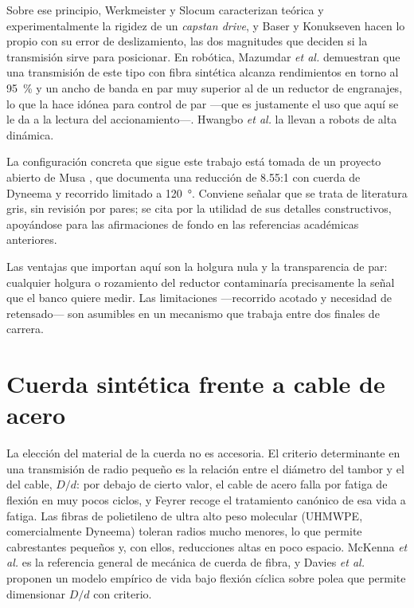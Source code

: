 Sobre ese principio, Werkmeister y Slocum \cite{werkmeister2007} caracterizan teórica y
experimentalmente la rigidez de un \emph{capstan drive}, y Baser y Konukseven \cite{baser2010} hacen
lo propio con su error de deslizamiento, las dos magnitudes que deciden si la transmisión sirve para
posicionar. En robótica, Mazumdar \emph{et al.} \cite{mazumdar2017} demuestran que una transmisión
de este tipo con fibra sintética alcanza rendimientos en torno al \SI{95}{\percent} y un ancho de
banda en par muy superior al de un reductor de engranajes, lo que la hace idónea para control de par
---que es justamente el uso que aquí se le da a la lectura del accionamiento---. Hwangbo \emph{et
al.} \cite{hwangbo2018} la llevan a robots de alta dinámica.

La configuración concreta que sigue este trabajo está tomada de un proyecto abierto de Musa
\cite{musa2024}, que documenta una reducción de \num{8.55}:1 con cuerda de Dyneema y recorrido
limitado a \SI{120}{\degree}. Conviene señalar que se trata de literatura gris, sin revisión por
pares; se cita por la utilidad de sus detalles constructivos, apoyándose para las afirmaciones de
fondo en las referencias académicas anteriores.

Las ventajas que importan aquí son la holgura nula y la transparencia de par: cualquier holgura o
rozamiento del reductor contaminaría precisamente la señal que el banco quiere medir. Las
limitaciones ---recorrido acotado y necesidad de retensado--- son asumibles en un mecanismo que
trabaja entre dos finales de carrera.

\section{Cuerda sintética frente a cable de acero}
\label{sec:arte-dyneema}

La elección del material de la cuerda no es accesoria. El criterio determinante en una transmisión
de radio pequeño es la relación entre el diámetro del tambor y el del cable, $D/d$: por debajo de
cierto valor, el cable de acero falla por fatiga de flexión en muy pocos ciclos, y Feyrer
\cite{feyrer2007} recoge el tratamiento canónico de esa vida a fatiga. Las fibras de polietileno de
ultra alto peso molecular (UHMWPE, comercialmente Dyneema) toleran radios mucho menores, lo que
permite cabrestantes pequeños y, con ellos, reducciones altas en poco espacio. McKenna \emph{et al.}
\cite{mckenna2004} es la referencia general de mecánica de cuerda de fibra, y Davies \emph{et al.}
\cite{davies2015} proponen un modelo empírico de vida bajo flexión cíclica sobre polea que permite
dimensionar $D/d$ con criterio.

